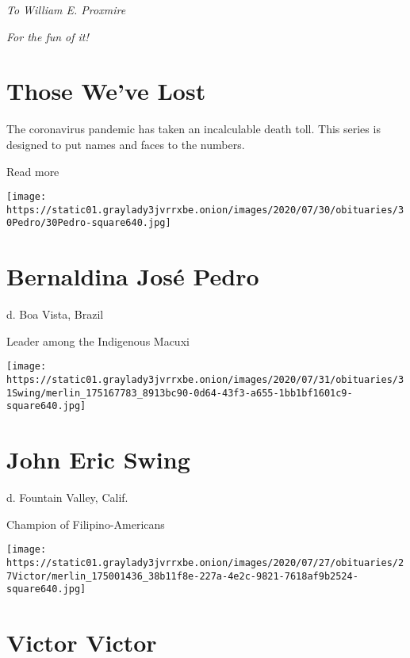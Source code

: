 \emph{To William E. Proxmire}

\emph{For the fun of it!}

\href{https://www.nytimes3xbfgragh.onion/interactive/2020/obituaries/people-died-coronavirus-obituaries.html?action=click\&pgtype=Article\&state=default\&region=BELOW_MAIN_CONTENT\&context=covid_obits_promo}{}

\hypertarget{those-weve-lost}{%
\section{Those We've Lost}\label{those-weve-lost}}

The coronavirus pandemic has taken an incalculable death toll. This
series is designed to put names and faces to the numbers.

Read more

\texttt{[image: https://static01.graylady3jvrrxbe.onion/images/2020/07/30/obituaries/30Pedro/30Pedro-square640.jpg]}

\hypertarget{bernaldina-josuxe9-pedro}{%
\section{Bernaldina José Pedro}\label{bernaldina-josuxe9-pedro}}

d. Boa Vista, Brazil

Leader among the Indigenous Macuxi

\texttt{[image: https://static01.graylady3jvrrxbe.onion/images/2020/07/31/obituaries/31Swing/merlin\_175167783\_8913bc90-0d64-43f3-a655-1bb1bf1601c9-square640.jpg]}

\hypertarget{john-eric-swing}{%
\section{John Eric Swing}\label{john-eric-swing}}

d. Fountain Valley, Calif.

Champion of Filipino-Americans

\texttt{[image: https://static01.graylady3jvrrxbe.onion/images/2020/07/27/obituaries/27Victor/merlin\_175001436\_38b11f8e-227a-4e2c-9821-7618af9b2524-square640.jpg]}

\hypertarget{victor-victor}{%
\section{Victor Victor}\label{victor-victor}}

